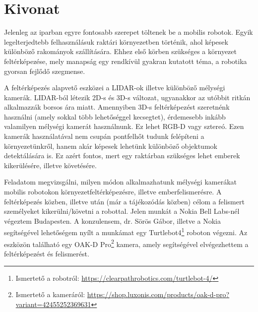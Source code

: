 \setcounter{page}{1}

\selecthungarian

\chapter*{Kivonat}

Jelenleg az iparban egyre fontosabb szerepet töltenek be a mobilis robotok\cite{MobRobots}. Egyik legelterjedtebb felhasználásuk raktári környezetben történik, ahol képesek különböző rakományok szállítására. Ehhez első körben szükséges a környezet feltérképezése, mely manapság egy rendkívül gyakran kutatott téma, a robotika gyorsan fejlődő szegmense.

A feltérképezés alapvető eszközei a LIDAR-ok illetve különböző mélységi kamerák. LIDAR-ból létezik 2D-s és 3D-s változat, ugyanakkor az utóbbit ritkán alkalmazzák borsos ára miatt. Amennyiben 3D-s feltérképezést szeretnénk használni (amely sokkal több lehetőséggel kecsegtet), érdemesebb inkább valamilyen mélységi kamerát használnunk. Ez lehet RGB-D\cite{RGB-D} vagy sztereó\cite{Stereo}. Ezen kamerák használatával nem csupán pontfelhőt tudunk felépíteni a környezetünkről, hanem akár képesek lehetünk különböző objektumok detektálására is. Ez azért fontos, mert egy raktárban szükséges lehet emberek kikerülésére, illetve követésére.

Feladatom megvizsgálni, milyen módon alkalmazhatunk mélységi kamerákat mobilis robotokon környezetfeltérképezésre, illetve emberfelismerésre. A feltérképezés közben, illetve után (már a tájékozódás közben) célom a felismert személyeket kikerülni/követni a robottal. Jelen munkát a Nokia Bell Labs-nél végeztem Budapesten. A konzulensem, dr. Sörös Gábor, illetve a Nokia segítségével lehetőségem nyílt a munkámat egy Turtlebot4\footnote{Ismertető a robotról: \url{https://clearpathrobotics.com/turtlebot-4/}} roboton végezni. Az eszközön található egy OAK-D Pro\footnote{Ismertető a kameráról: \url{https://shop.luxonis.com/products/oak-d-pro?variant=42455252369631}} kamera, amely segítségével elvégezhettem a feltérképezést és felismerést.

\vfill
\selectenglish


